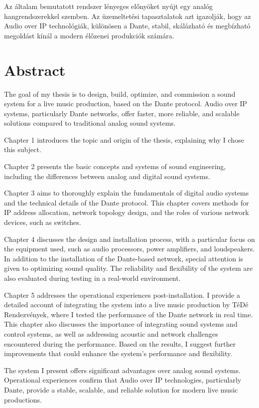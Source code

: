 Az általam bemutatott rendszer lényeges előnyöket nyújt egy analóg 
hangrendszerekkel szemben.
Az üzemeltetési tapasztalatok azt igazolják, hogy 
az Audio over IP technológiák, különösen a Dante, 
stabil, skálázható és megbízható megoldást 
kínál a modern élőzenei produkciók számára.


\vfill
\selectenglish


\chapter*{Abstract}

The goal of my thesis is to design, build, optimize, and commission a sound system for 
a live music production, based on the Dante protocol. Audio over IP systems, 
particularly Dante networks, offer faster, more reliable, and scalable 
solutions compared to traditional analog sound systems.

Chapter 1 introduces the topic and origin of the thesis, explaining why I chose this subject.

Chapter 2 presents the basic concepts and systems of sound engineering, including 
the differences between analog and digital sound systems.

Chapter 3 aims to thoroughly explain the fundamentals of digital audio systems and 
the technical details of the Dante protocol. This chapter covers methods for IP 
address allocation, network topology design, and the roles of various network devices, such as switches.

Chapter 4 discusses the design and installation process, with a particular focus on 
the equipment used, such as audio processors, power amplifiers, and loudspeakers. 
In addition to the installation of the Dante-based network, special attention is given to optimizing sound quality. The reliability and flexibility of the system are also evaluated during testing in a real-world environment.

Chapter 5 addresses the operational experiences post-installation. I provide a 
detailed account of integrating the system into a live music production 
by TéDé Rendezvények, where I tested the performance of the Dante network in real time. 
This chapter also discusses the importance of integrating sound systems and 
control systems, as well as addressing acoustic and network challenges 
encountered during the performance. Based on the results, I suggest further 
improvements that could enhance the system's performance and flexibility.

The system I present offers significant advantages over analog sound systems. 
Operational experiences confirm that Audio over IP technologies, particularly Dante, provide a stable, scalable, and reliable solution for modern live music productions.

\vfill
\selectthesislanguage

\setcounter{romanPage}{\value{page}}
